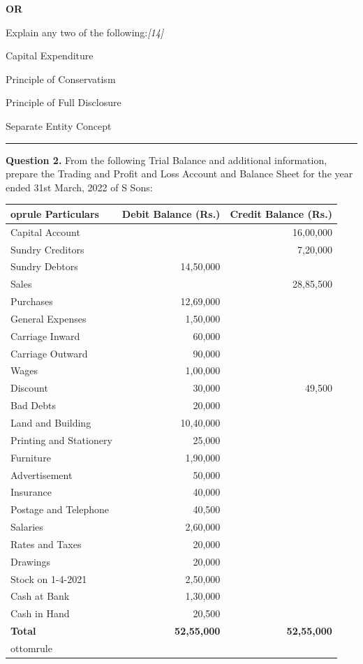 \documentclass[11pt,a4paper]{article}
\newcommand{\pts}[1]{\hfill   \textit{[#1]}}
\begin{document}
\centerline{   \textbf{OR}}

Explain any two of the following:\pts{14}

\begin{parts}
  \item Capital Expenditure
  \item Principle of Conservatism
  \item Principle of Full Disclosure
  \item Separate Entity Concept
\end{parts}

\medskip\rule{\linewidth}{0.2pt}


\newpage




\noindent   \textbf{Question 2.}
From the following Trial Balance and additional information, prepare the Trading and Profit and Loss Account and Balance Sheet for the year ended 31st March, 2022 of S Sons:

\begin{center}
  \small
  
\begin{tabular}{lrr}
     oprule
   \textbf{Particulars} &   \textbf{Debit Balance (Rs.)} &   \textbf{Credit Balance (Rs.)} \\
    \midrule
    Capital Account & & 16,00,000 \\
    Sundry Creditors & & 7,20,000 \\
    Sundry Debtors & 14,50,000 & \\
    Sales & & 28,85,500 \\
    Purchases & 12,69,000 & \\
    General Expenses & 1,50,000 & \\
    Carriage Inward & 60,000 & \\
    Carriage Outward & 90,000 & \\
    Wages & 1,00,000 & \\
    Discount & 30,000 & 49,500 \\
    Bad Debts & 20,000 & \\
    Land and Building & 10,40,000 & \\
    Printing and Stationery & 25,000 & \\
    Furniture & 1,90,000 & \\
    Advertisement & 50,000 & \\
    Insurance & 40,000 & \\
    Postage and Telephone & 40,500 & \\
    Salaries & 2,60,000 & \\
    Rates and Taxes & 20,000 & \\
    Drawings & 20,000 & \\
    Stock on 1-4-2021 & 2,50,000 & \\
    Cash at Bank & 1,30,000 & \\
    Cash in Hand & 20,500 & \\
    \midrule
   \textbf{Total} &   \textbf{52,55,000} &   \textbf{52,55,000} \\
    ottomrule
  \end{tabular}
\end{center}
\end{document}
